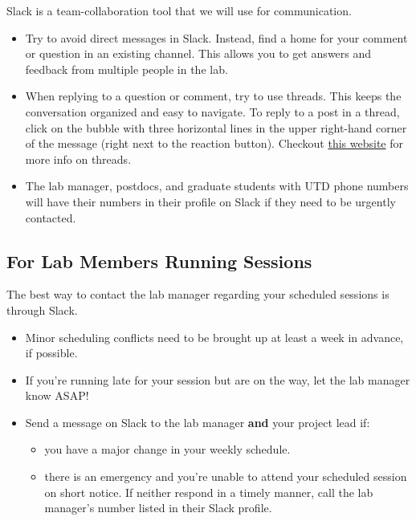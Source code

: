 \documentclass[
]{book}
\providecommand{\tightlist}{%
  \setlength{\itemsep}{0pt}\setlength{\parskip}{0pt}}
\begin{document}
Slack is a team-collaboration tool that we will use for communication.

\begin{itemize}
\tightlist
\item
  Try to avoid direct messages in Slack. Instead, find a home for your comment or question in an existing channel. This allows you to get answers and feedback from multiple people in the lab.\\
\item
  When replying to a question or comment, try to use threads. This keeps the conversation organized and easy to navigate. To reply to a post in a thread, click on the bubble with three horizontal lines in the upper right-hand corner of the message (right next to the reaction button). Checkout \href{https://slack.com/help/articles/115000769927-Use-threads-to-organize-discussions-}{this website} for more info on threads.
\item
  The lab manager, postdocs, and graduate students with UTD phone numbers will have their numbers in their profile on Slack if they need to be urgently contacted.
\end{itemize}

\hypertarget{for-lab-members-running-sessions}{%
\subsection{For Lab Members Running Sessions}\label{for-lab-members-running-sessions}}

The best way to contact the lab manager regarding your scheduled sessions is through Slack.

\begin{itemize}
\tightlist
\item
  Minor scheduling conflicts need to be brought up at least a week in advance, if possible.
\item
  If you're running late for your session but are on the way, let the lab manager know ASAP!
\item
  Send a message on Slack to the lab manager \textbf{and} your project lead if:

  \begin{itemize}
  \tightlist
  \item
    you have a major change in your weekly schedule.
  \item
    there is an emergency and you're unable to attend your scheduled session on short notice. If neither respond in a timely manner, call the lab manager's number listed in their Slack profile.
  \end{itemize}
\end{itemize}
\end{document}
